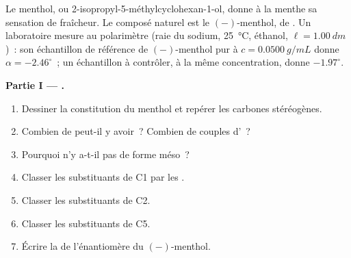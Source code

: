 \begin{problem}
\label{pb:b1:stereochemistry-in-depth:1}
Le menthol, ou 2-isopropyl-5-méthylcyclohexan-1-ol, donne à la menthe sa
sensation de fraîcheur. Le composé naturel est le $(-)$-menthol, de
. Un laboratoire mesure au polarimètre (raie du sodium,
\qty{25}{\celsius}, éthanol, $\ell = \qty{1.00}{dm}$)~: son échantillon
de référence de $(-)$-menthol pur à $c = \qty{0.0500}{g/mL}$ donne
$\alpha =
-2.46^\circ$~; un échantillon à contrôler, à la même concentration,
donne $-1.97^\circ$.

\medskip
\noindent\textbf{Partie I --- .}
\begin{enumerate}
  \item Dessiner la constitution du menthol et repérer les carbones
        stéréogènes.
  \item Combien de  peut-il y avoir~? Combien de couples
        d'~?
  \item Pourquoi n'y a-t-il pas de forme méso~?
  \item Classer les substituants de C1 par les .
  \item Classer les substituants de C2.
  \item Classer les substituants de C5.
  \item Écrire la  de l'énantiomère du $(-)$-menthol.
\end{enumerate}


\end{problem}
